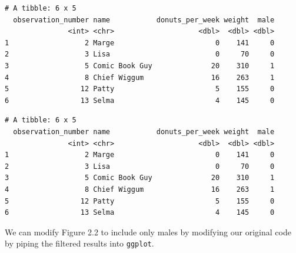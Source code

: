 \documentclass[]{book}
\newenvironment{Shaded}{\begin{snugshade}}{\end{snugshade}}
\newcommand{\DecValTok}[1]{\textcolor[rgb]{0.00,0.00,0.81}{#1}}
\newcommand{\KeywordTok}[1]{\textcolor[rgb]{0.13,0.29,0.53}{\textbf{#1}}}
\newcommand{\NormalTok}[1]{#1}
\newcommand{\OperatorTok}[1]{\textcolor[rgb]{0.81,0.36,0.00}{\textbf{#1}}}
\newcommand{\StringTok}[1]{\textcolor[rgb]{0.31,0.60,0.02}{#1}}
\begin{document}
\begin{Shaded}
\end{Shaded}

\begin{verbatim}
# A tibble: 6 x 5
  observation_number name           donuts_per_week weight  male
               <int> <chr>                    <dbl>  <dbl> <dbl>
1                  2 Marge                        0    141     0
2                  3 Lisa                         0     70     0
3                  5 Comic Book Guy              20    310     1
4                  8 Chief Wiggum                16    263     1
5                 12 Patty                        5    155     0
6                 13 Selma                        4    145     0
\end{verbatim}

\begin{Shaded}
\end{Shaded}

\begin{verbatim}
# A tibble: 6 x 5
  observation_number name           donuts_per_week weight  male
               <int> <chr>                    <dbl>  <dbl> <dbl>
1                  2 Marge                        0    141     0
2                  3 Lisa                         0     70     0
3                  5 Comic Book Guy              20    310     1
4                  8 Chief Wiggum                16    263     1
5                 12 Patty                        5    155     0
6                 13 Selma                        4    145     0
\end{verbatim}

We can modify Figure 2.2 to include only males by modifying our original code by piping the filtered results into \texttt{ggplot}.
\end{document}
